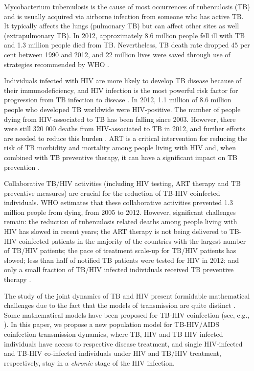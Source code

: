 \documentclass{my_aims}
\theoremstyle{definition}
\begin{document}
Mycobacterium tuberculosis is the cause of most occurrences of tuberculosis (TB)
and is usually acquired via airborne infection from someone who has active TB.
It typically affects the lungs (pulmonary TB) but can affect other sites as well
(extrapulmonary TB). In 2012, approximately 8.6 million people fell ill with TB
and 1.3 million people died from TB. Nevertheless, TB death rate dropped 45 per cent
between 1990 and 2012, and 22 million lives were saved through use of strategies
recommended by WHO \cite{TB_WHO_report_2013}.

Individuals infected with HIV are more likely to develop TB disease because of their
immunodeficiency, and HIV infection is the most powerful risk factor for progression
from TB infection to disease \cite{Getahun:etall:CID2010}. In 2012, 1.1 million
of 8.6 million people who developed TB worldwide were HIV-positive. The number
of people dying from HIV-associated to TB has been falling since 2003. However,
there were still 320 000 deaths from HIV-associated to TB in 2012, and further efforts
are needed to reduce this burden \cite{TB_WHO_report_2013}. ART is a critical intervention
for reducing the risk of TB morbidity and mortality among people living with HIV and,
when combined with TB preventive therapy, it can have a significant impact
on TB prevention \cite{TB_WHO_report_2013}.

Collaborative TB/HIV activities (including HIV testing, ART therapy and TB preventive measures)
are crucial for the reduction of TB-HIV coinfected individuals. WHO estimates that these collaborative
activities prevented 1.3 million people from dying, from 2005 to 2012. However, significant
challenges remain: the reduction of tuberculosis related deaths among people living with HIV
has slowed in recent years; the ART therapy is not being delivered to TB-HIV coinfected patients
in the majority of the countries with the largest number of TB/HIV patients; the pace of treatment
scale-up for TB/HIV patients has slowed; less than half of notified TB patients were tested
for HIV in 2012; and only a small fraction of TB/HIV infected individuals received
TB preventive therapy \cite{UNAIDS_report_2013}.

The study of the joint dynamics of TB and HIV present formidable mathematical challenges
due to the fact that the models of transmission are quite distinct \cite{CChavez_TB_HIV_2009}.
Some mathematical models have been proposed for TB-HIV coinfection (see, e.g.,
\cite{Mod:TB:HIV:Bacaer:JMB:2008,Bhunu:BMB:2009:HIV:TB,Kirschner:TB:HIV:1999,Mod:TB:HIV:Magombedze:MathPop:2010,Naresh:TB:HIV:2005,CChavez_TB_HIV_2009,Song:TB:HIV:2008}).
In this paper, we propose a new population model for TB-HIV/AIDS coinfection transmission dynamics,
where TB, HIV and TB-HIV infected individuals have access to respective disease treatment,
and single HIV-infected and TB-HIV co-infected individuals under HIV and TB/HIV treatment,
respectively, stay in a \emph{chronic} stage of the HIV infection.
\end{document}
